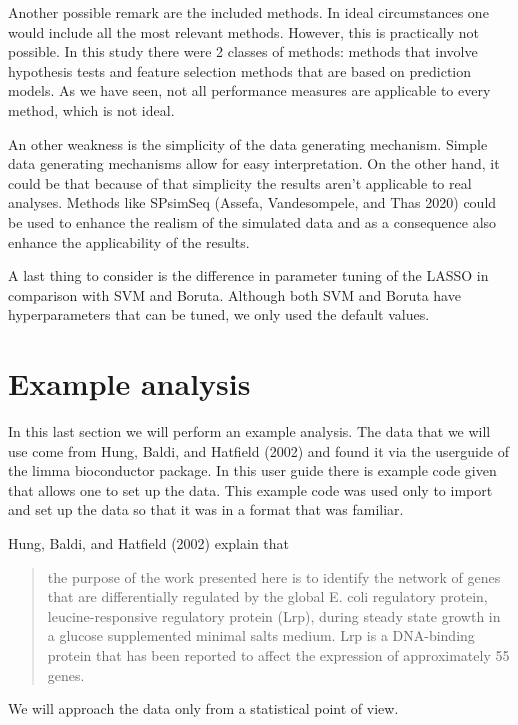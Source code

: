 \documentclass[
]{article}
\begin{document}
Another possible remark are the included methods. In ideal circumstances one would include all the most relevant methods. However, this is practically not possible. In this study there were 2 classes of methods: methods that involve hypothesis tests and feature selection methods that are based on prediction models. As we have seen, not all performance measures are applicable to every method, which is not ideal.

An other weakness is the simplicity of the data generating mechanism. Simple data generating mechanisms allow for easy interpretation. On the other hand, it could be that because of that simplicity the results aren't applicable to real analyses. Methods like SPsimSeq (Assefa, Vandesompele, and Thas 2020) could be used to enhance the realism of the simulated data and as a consequence also enhance the applicability of the results.

A last thing to consider is the difference in parameter tuning of the LASSO in comparison with SVM and Boruta. Although both SVM and Boruta have hyperparameters that can be tuned, we only used the default values.

\newpage

\hypertarget{example-analysis}{%
\section{Example analysis}\label{example-analysis}}

In this last section we will perform an example analysis. The data that we will use come from Hung, Baldi, and Hatfield (2002) and found it via the userguide of the limma bioconductor package. In this user guide there is example code given that allows one to set up the data. This example code was used only to import and set up the data so that it was in a format that was familiar.

Hung, Baldi, and Hatfield (2002) explain that

\begin{quote}
the purpose of the work presented here is to identify the network of genes that are differentially regulated by the global E. coli regulatory protein, leucine-responsive regulatory protein (Lrp), during steady state growth in a glucose supplemented minimal salts medium. Lrp is a DNA-binding protein that has been reported to affect the expression of approximately 55 genes.
\end{quote}

We will approach the data only from a statistical point of view.
\end{document}
